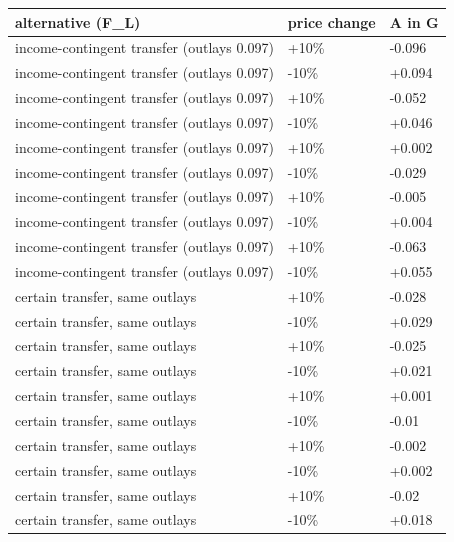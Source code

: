 \begingroup\small
\setlength{\tabcolsep}{3pt}
\renewcommand{\arraystretch}{1.04}
\begin{tabularx}{\linewidth}{XXX}
\toprule
alternative (F\_L) & price change & A in G \\
\midrule
income-contingent transfer (outlays 0.097) & +10\% & -0.096 \\
income-contingent transfer (outlays 0.097) & -10\% & +0.094 \\
income-contingent transfer (outlays 0.097) & +10\% & -0.052 \\
income-contingent transfer (outlays 0.097) & -10\% & +0.046 \\
income-contingent transfer (outlays 0.097) & +10\% & +0.002 \\
income-contingent transfer (outlays 0.097) & -10\% & -0.029 \\
income-contingent transfer (outlays 0.097) & +10\% & -0.005 \\
income-contingent transfer (outlays 0.097) & -10\% & +0.004 \\
income-contingent transfer (outlays 0.097) & +10\% & -0.063 \\
income-contingent transfer (outlays 0.097) & -10\% & +0.055 \\
certain transfer, same outlays & +10\% & -0.028 \\
certain transfer, same outlays & -10\% & +0.029 \\
certain transfer, same outlays & +10\% & -0.025 \\
certain transfer, same outlays & -10\% & +0.021 \\
certain transfer, same outlays & +10\% & +0.001 \\
certain transfer, same outlays & -10\% & -0.01 \\
certain transfer, same outlays & +10\% & -0.002 \\
certain transfer, same outlays & -10\% & +0.002 \\
certain transfer, same outlays & +10\% & -0.02 \\
certain transfer, same outlays & -10\% & +0.018 \\
\bottomrule
\end{tabularx}
\endgroup
